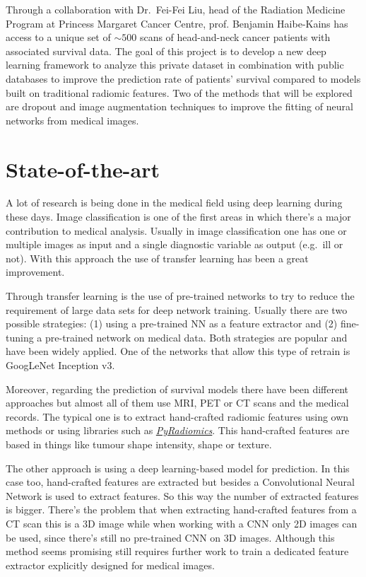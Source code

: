 \documentclass[a4paper, 12pt]{article}
\begin{document}
Through a collaboration with Dr.~Fei-Fei Liu, head of the Radiation Medicine Program at Princess
Margaret Cancer Centre, prof. Benjamin Haibe-Kains has access to a unique set of \( {\sim}500 \) 
scans of head-and-neck cancer patients with associated survival data. The goal of this project is 
to develop a new deep learning framework to analyze this private dataset in combination with public 
databases to improve the prediction rate of patients' survival compared to models built on 
traditional radiomic features. Two of the methods that will be explored are dropout and image 
augmentation techniques to improve the fitting of neural networks from medical images. 

\section{State-of-the-art}

A lot of research is being done in the medical field using deep learning during these days. Image
classification is one of the first areas in which there's a major contribution to medical analysis.
Usually in image classification one has one or multiple images as input and a single diagnostic 
variable as output (e.g.~ill or not). With this approach the use of transfer learning has been a
great improvement.
~\cite{survey-deep-learning}

Through transfer learning is the use of pre-trained networks to try to reduce the requirement of 
large data sets for deep network training. Usually there are two possible strategies: (1) using a 
pre-trained NN as a feature extractor and (2) fine-tuning a pre-trained network on medical data.
Both strategies are popular and have been widely applied. One of the networks that allow this type
of retrain is GoogLeNet Inception v3.
~\cites{GoogLeNet}{NNRetrain}{inceptionRetrain}

Moreover, regarding the prediction of survival models there have been different approaches but
almost all of them use MRI, PET or CT scans and the medical records. The typical one is to extract
hand-crafted radiomic features using own methods or using libraries such as
\href{https://github.com/Radiomics/pyradiomics}{\emph{PyRadiomics}}. This hand-crafted features are
based in things like tumour shape intensity, shape or texture.
~\cites{PyRadiomics}{tumour-radiomics}

The other approach is using a deep learning-based model for prediction. In this case too, 
hand-crafted features are extracted but besides a Convolutional Neural Network is used to extract
features. So this way the number of extracted features is bigger. There's the problem that when
extracting hand-crafted features from a CT scan this is a 3D image while when working with a 
CNN only 2D images can be used, since there's still no pre-trained CNN on 3D images. Although
this method seems promising still requires further work to train a dedicated feature extractor 
explicitly designed for medical images.
~\cite{deep-learning-radiomics-gbm}
\end{document}
